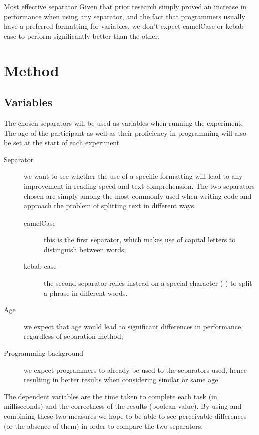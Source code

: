 \documentclass{article}
\begin{document}
\begin{Hypotheses*}{Most effective separator}{}
	Given that prior research simply proved an increase in performance when using any separator, and the fact that 
	programmers usually have a preferred formatting for variables, we don't expect camelCase or kebab-case to perform 
	significantly better than the other.
\end{Hypotheses*}

\section{Method}
\subsection{Variables}
The chosen separators will be used as variables when running the experiment. The age of the participant as well as their proficiency in programming 
will also be set at the start of each experiment
\begin{description}
	\item[Separator] we want to see whether the use of a specific formatting will lead to any improvement in reading speed and text comprehension. 
	The two separators chosen are simply among the most commonly used when writing code and approach the problem of 
	splitting text in different ways
	\begin{description}
		\item[camelCase] this is the first separator, which makes use of capital letters to distinguish between words;
		\item[kebab-case] the second separator relies instead on a special character (-) to split a phrase in different words.
	\end{description}
	\item[Age] we expect that age would lead to significant differences in performance, regardless of separation method;
	\item[Programming background] we expect programmers to already be used to the separators used, hence resulting in better results when considering 
	similar or same age.
\end{description}

The dependent variables are the time taken to complete each task (in milliseconds) and the correctness of the results (boolean value). By using and combining these 
two measures we hope to be able to see perceivable differences (or the absence of them) in order to compare the two separators.
\end{document}
